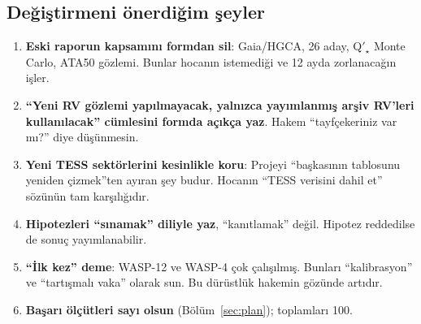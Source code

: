 \subsection{Değiştirmeni önerdiğim şeyler}
\begin{enumerate}[leftmargin=*]
\item \textbf{Eski raporun kapsamını formdan sil}: Gaia/HGCA, 26 aday, Q$'_\star$ Monte Carlo, ATA50 gözlemi. Bunlar
      hocanın istemediği ve 12 ayda zorlanacağın işler.
\item \textbf{“Yeni RV gözlemi yapılmayacak, yalnızca yayımlanmış arşiv RV'leri kullanılacak” cümlesini formda açıkça yaz}.
      Hakem “tayfçekeriniz var mı?” diye düşünmesin.
\item \textbf{Yeni TESS sektörlerini kesinlikle koru}: Projeyi “başkasının tablosunu yeniden çizmek”ten ayıran şey budur.
      Hocanın “TESS verisini dahil et” sözünün tam karşılığıdır.
\item \textbf{Hipotezleri “sınamak” diliyle yaz}, “kanıtlamak” değil. Hipotez reddedilse de sonuç yayımlanabilir.
\item \textbf{“İlk kez” deme}: WASP-12 ve WASP-4 çok çalışılmış. Bunları “kalibrasyon” ve “tartışmalı vaka” olarak sun.
      Bu dürüstlük hakemin gözünde artıdır.
\item \textbf{Başarı ölçütleri sayı olsun} (Bölüm~\ref{sec:plan}); toplamları 100.
\end{enumerate}

